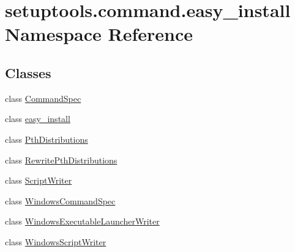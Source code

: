 \hypertarget{namespacesetuptools_1_1command_1_1easy__install}{}\section{setuptools.\+command.\+easy\+\_\+install Namespace Reference}
\label{namespacesetuptools_1_1command_1_1easy__install}
\subsection*{Classes}
\begin{DoxyCompactItemize}
\item 
class \hyperlink{classsetuptools_1_1command_1_1easy__install_1_1_command_spec}{Command\+Spec}
\item 
class \hyperlink{classsetuptools_1_1command_1_1easy__install_1_1easy__install}{easy\+\_\+install}
\item 
class \hyperlink{classsetuptools_1_1command_1_1easy__install_1_1_pth_distributions}{Pth\+Distributions}
\item 
class \hyperlink{classsetuptools_1_1command_1_1easy__install_1_1_rewrite_pth_distributions}{Rewrite\+Pth\+Distributions}
\item 
class \hyperlink{classsetuptools_1_1command_1_1easy__install_1_1_script_writer}{Script\+Writer}
\item 
class \hyperlink{classsetuptools_1_1command_1_1easy__install_1_1_windows_command_spec}{Windows\+Command\+Spec}
\item 
class \hyperlink{classsetuptools_1_1command_1_1easy__install_1_1_windows_executable_launcher_writer}{Windows\+Executable\+Launcher\+Writer}
\item 
class \hyperlink{classsetuptools_1_1command_1_1easy__install_1_1_windows_script_writer}{Windows\+Script\+Writer}
\end{DoxyCompactItemize}
